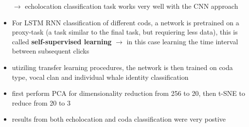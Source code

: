 \documentclass[12pt,a4paper]{article}
\begin{document}
\begin{itemize}
  \newline \indent $\longrightarrow$ echolocation classification task works very well with the CNN approach
  \item For LSTM RNN classification of different cods, a network is pretrained on a proxy-task (a task similar to the final task, but requiering less data), this is called \textbf{self-supervised learning}
  \newline \indent $\longrightarrow$ in this case learning the time interval between subsequent clicks
  \item utiziling transfer learning procedures, the network is then trained on coda type, vocal clan and individual whale identity classification
  \item first perform PCA for dimensionality reduction from 256 to 20, then t-SNE to reduce from 20 to 3
  \item results from both echolocation and coda classification were very postive
\end{itemize}

\newpage
\end{document}
